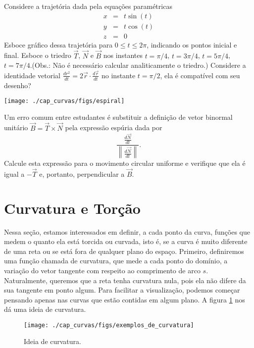 \begin{exer} Considere a trajetória dada pela equações paramétricas
\begin{eqnarray*}
x&=&t\sin (t)\\
y&=&t\cos (t)\\
z&=&0
\end{eqnarray*}
Esboce gráfico dessa trajetória para $0\leq t \leq 2\pi$, indicando os pontos inicial e final. Esboce o triedro $\vec{T}$, $\vec{N}$ e $\vec{B}$ nos instantes $t=\pi/4$, $t=3\pi/4$, $t=5\pi/4$, $t=7\pi/4$.(Obs.: Não é necessário calcular analiticamente o triedro.) Considere a identidade vetorial $\frac{d r^2}{dt}=2\vec{r}\cdot\frac{d\vec{r}}{dt}$ no instante $t=\pi/2$, ela é compatível com seu desenho?
\end{exer}
\begin{resp}
 \texttt{[image: ./cap\_curvas/figs/espiral]}
\end{resp}

\begin{exer} Um erro comum entre estudantes é substituir a definição de vetor binormal unitário $\vec{B}=\vec{T}\times\vec{N}$ pela expressão espúria dada por $$\frac{\frac{d\vec{N}}{dt}}{\left\|\frac{d\vec{N}}{dt}\right\|}.$$ Calcule esta expressão para o movimento circular uniforme e verifique que ela é igual a $-\vec{T}$ e, portanto, perpendicular a $\vec{B}$.
\end{exer}


\construirExer


\section{Curvatura e Torção}

Nessa seção, estamos interessados em definir, a cada ponto da curva, funções que medem o quanto ela está torcida ou curvada, isto é, se a curva é muito diferente de uma reta ou se está fora de qualquer plano do espaço. Primeiro, definiremos uma função chamada de curvatura, que mede a cada ponto do domínio, a variação do vetor tangente com respeito ao comprimento de arco $s$. Naturalmente, queremos que a reta tenha curvatura nula, pois ela não difere da sua tangente em ponto algum. Para facilitar a visualização, podemos começar pensando apenas nas curvas que estão contidas em algum plano. A figura \ref{curvatura} nos dá uma ideia de curvatura.


\begin{figure}
\begin{center}
    \texttt{[image: ./cap\_curvas/figs/exemplos\_de\_curvatura]}
 \caption{Ideia de curvatura.\label{curvatura}}
  \end{center}
\end{figure}
 
